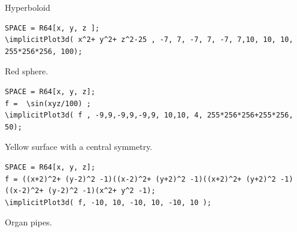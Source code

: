  
Hyperboloid



\begin{verbatim}
SPACE = R64[x, y, z ];
\implicitPlot3d( x^2+ y^2+ z^2-25 , -7, 7, -7, 7, -7, 7,10, 10, 10, 255*256*256, 100);
\end{verbatim}

Red sphere.




\begin{verbatim}
SPACE = R64[x, y, z]; 
f =  \sin(xyz/100) ;
\implicitPlot3d( f , -9,9,-9,9,-9,9, 10,10, 4, 255*256*256+255*256, 50);
\end{verbatim}

Yellow surface with a central symmetry.


\begin{verbatim}
SPACE = R64[x, y, z]; 
f = ((x+2)^2+ (y-2)^2 -1)((x-2)^2+ (y+2)^2 -1)((x+2)^2+ (y+2)^2 -1) ((x-2)^2+ (y-2)^2 -1)(x^2+ y^2 -1); 
\implicitPlot3d( f, -10, 10, -10, 10, -10, 10 );
\end{verbatim}

Organ pipes.
